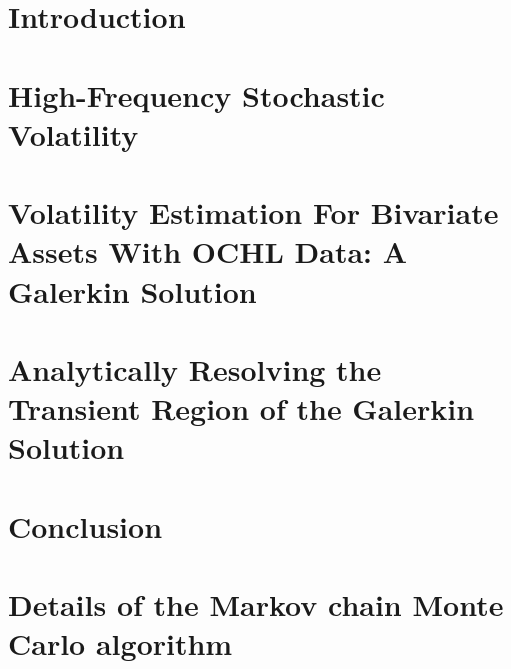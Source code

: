 \chapter{Introduction}


\chapter{High-Frequency Stochastic Volatility}

  
\chapter{Volatility Estimation For Bivariate Assets With OCHL Data: A Galerkin Solution}


\chapter{Analytically Resolving the Transient Region of the Galerkin Solution}


\chapter{Conclusion}


\appendix 
\chapter{Details of the Markov chain Monte Carlo algorithm}


\nocite{*}

\singlespacing

\doublespacing

